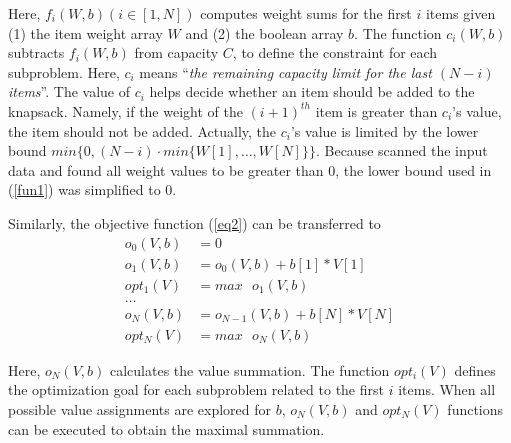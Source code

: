 Here, $f_i(W, b) (i\in[1, N])$ computes weight sums for the first $i$ items given (1) the item weight array $W$ and (2) the boolean array $b$.
The function $c_i(W, b)$ subtracts $f_i(W, b)$ from capacity $C$, to define the constraint for each subproblem. Here, $c_i$ means ``\emph{the remaining capacity limit for the last $(N-i)$ items}''. 
The value of $c_i$ helps decide whether an item should be added to the knapsack. Namely, if the weight of the $(i+1)^{th}$ item is greater than $c_i$'s value, the item should not be added.
Actually, the $c_i$'s value is limited by the lower bound $min\{0, (N - i) \cdot min\{W[1], \ldots, W[N]\}\}$. Because \tool scanned the input data and found all weight values to be greater than 0, the lower bound used in (\ref{fun1}) was simplified to 0.

Similarly, the objective function (\ref{eq2}) can be transferred to
\begin{align}
\label{fun2}
o_0(V, b)&=0 \nonumber\\
o_1(V, b)&=o_0(V, b) + b[1] * V[1]\nonumber\\
opt_1(V)&=max \text{ }o_1(V, b) \nonumber\\
\ldots \tag{3.4}\\
o_N(V, b)&=o_{N-1}(V, b) + b[N] * V[N]\nonumber\\
opt_N(V)&=max\text{ }o_N(V, b) \nonumber
\end{align}

Here, $o_N(V, b)$ calculates the value summation.
The function $opt_i(V)$ defines the optimization goal for each subproblem related to the first $i$ items. When all possible value assignments are explored for $b$, $o_N(V, b)$ and $opt_N(V)$ functions can be executed to obtain the maximal summation. 


